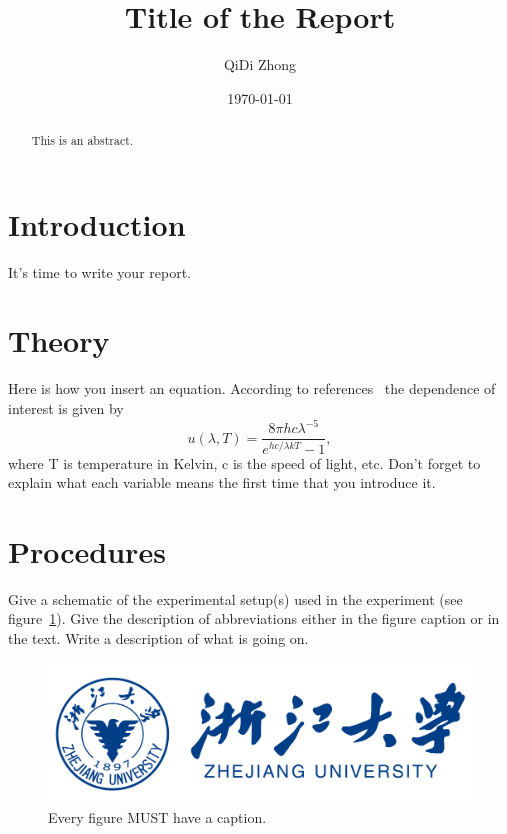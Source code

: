 \documentclass[letterpaper,12pt]{article}
\begin{document}
\title{Title of the Report}
\author{QiDi Zhong}
\date{\today}
\maketitle

\begin{abstract}
This is an abstract.    
\end{abstract}



\section{Introduction}

It's time to write your report.

\section{Theory}

Here is how you insert an equation. According to references~\cite{Cyr} the dependence of interest is given by
\begin{equation} \label{eq:aperp} 
u(\lambda,T)=\frac{8\pi hc\lambda^{-5}}{e^{hc/\lambda kT}-1},
\end{equation}
where T is temperature in Kelvin, c is the speed of light, etc. Don't forget to explain what each variable means the first time that you introduce it.

\section{Procedures}

Give a schematic of the experimental setup(s) used in the experiment (see
figure~\ref{fig:samplesetup}). Give the description of  abbreviations
either in the figure caption or in the text. Write a description of what is
going on. 

\begin{figure}[ht] 
        \centering 
        \includegraphics[width=0.3\linewidth]{fig/ZJU logo.png}
        \caption{
            Every figure MUST have a caption.
        }
        \label{fig:samplesetup}
\end{figure}
\end{document}
